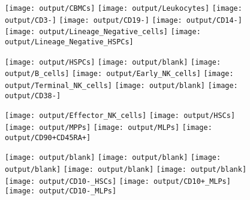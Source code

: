 \documentclass[11pt]{article}
\begin{document}
\begin{figure}[htbp]
\begin{minipage}[t]{0.125\textwidth}
    \centering
    \texttt{[image: output/CBMCs]}
    \texttt{[image: output/Leukocytes]}
    \texttt{[image: output/CD3-]}
    \texttt{[image: output/CD19-]}
    \texttt{[image: output/CD14-]}
    \texttt{[image: output/Lineage\_Negative\_cells]}
    \texttt{[image: output/Lineage\_Negative\_HSPCs]}
  \end{minipage}%
  \begin{minipage}[t]{0.125\textwidth}
    \centering
    \vspace{-0.5\linewidth} %
    \texttt{[image: output/HSPCs]}
    \texttt{[image: output/blank]}
    \texttt{[image: output/B\_cells]}
    \texttt{[image: output/Early\_NK\_cells]}
    \texttt{[image: output/Terminal\_NK\_cells]}
    \texttt{[image: output/blank]}
    \texttt{[image: output/CD38-]}
  \end{minipage}%
  \begin{minipage}[t]{0.125\textwidth}
    \centering
    \vspace{4\linewidth} %
    \texttt{[image: output/Effector\_NK\_cells]}
    \texttt{[image: output/HSCs]}
    \texttt{[image: output/MPPs]}
    \texttt{[image: output/MLPs]}
    \texttt{[image: output/CD90+CD45RA+]}
  \end{minipage}%
  \begin{minipage}[t]{0.125\textwidth}
    \centering
    \vspace{-0.5\linewidth} %
    \texttt{[image: output/blank]}
    \texttt{[image: output/blank]}
    \texttt{[image: output/blank]}
    \texttt{[image: output/blank]}
    \texttt{[image: output/blank]}
    \texttt{[image: output/CD10-\_HSCs]}
    \texttt{[image: output/CD10+\_MLPs]}
    \texttt{[image: output/CD10-\_MLPs]}
  \end{minipage}%
  \label{fig:figure}
\end{figure}
\end{document}
